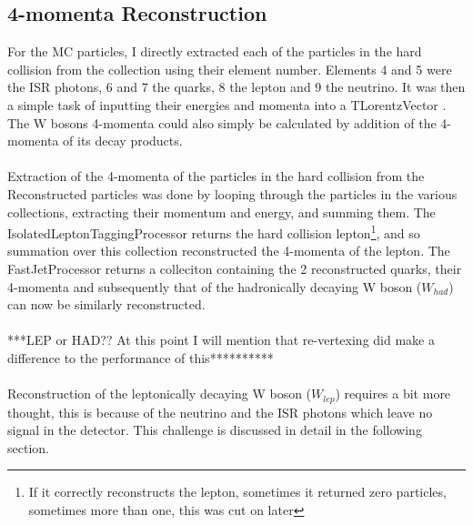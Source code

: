 \subsection{4-momenta Reconstruction}
\label{SUBSEC:4momentaReconstruction}
For the MC particles, I directly extracted each of the particles in the hard collision from the collection using their element number. Elements 4 and 5 were the ISR photons, 6 and 7 the quarks, 8 the lepton and 9 the neutrino. It was then a simple task of inputting their energies and momenta into a TLorentzVector \cite{TLorentzVector}. The W bosons 4-momenta could also simply be calculated by addition of the 4-momenta of its decay products.
\\\\
Extraction of the 4-momenta of the particles in the hard collision from the Reconstructed particles was done by looping through the particles in the various collections, extracting their momentum and energy, and summing them. The IsolatedLeptonTaggingProcessor \cite{IsolatedLeptonTaggingProcessor} returns the hard collision lepton\footnote{If it correctly reconstructs the lepton, sometimes it returned zero particles, sometimes more than one, this was cut on later}, and so summation over this collection reconstructed the 4-momenta of the lepton. The FastJetProcessor returns a colleciton containing the 2 reconstructed quarks, their 4-momenta and subsequently that of the hadronically decaying W boson (${W}_{had}$) can now be similarly reconstructed.
\\\\
***LEP or HAD?? At this point I will mention that re-vertexing did make a difference to the performance of this**********
\\\\
Reconstruction of the leptonically decaying W boson (${W}_{lep}$) requires a bit more thought, this is because of the neutrino and the ISR photons which leave no signal in the detector. This challenge is discussed in detail in the following section.


